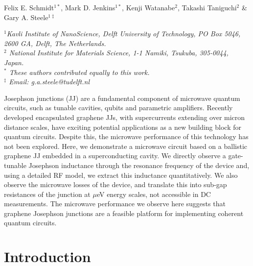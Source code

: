 \documentclass[preprint,
  onecolumn,
  notitlepage,
  amsmath,amssymb,
  aip,
  apl,
]{revtex4-1}
\begin{document}

\vspace{0.5em}

\noindent Felix E. Schmidt$^{1*}$, Mark D. Jenkins$^{1*}$, Kenji Watanabe$^2$, Takashi Taniguchi$^2$ \& Gary A. Steele$^{1\ddagger}$

\vspace{1em}

{\noindent\em $^1$Kavli Institute of NanoScience, Delft University of
	Technology, PO Box 5046, 2600 GA, Delft, The Netherlands.}
{\\\em $^2$ National Institute for Materials Science, 1-1 Namiki, Tsukuba, 305-0044, Japan.}
{\\\em $^*$ These authors contributed equally to this work.}
{\\\em $^\ddagger$ Email: g.a.steele@tudelft.nl}

\vspace{1em}

{\bfseries

\noindent Josephson junctions (JJ) are a fundamental component of microwave quantum circuits, such as tunable cavities, qubits and parametric amplifiers.
%
Recently developed encapsulated graphene JJs, with supercurrents extending over micron distance scales, have exciting potential applications as a new building block for quantum circuits. 
%  
Despite this, the microwave performance of this technology has not been explored.
%  
Here, we demonstrate a microwave circuit based on a ballistic graphene JJ embedded in a superconducting cavity.
%  
We directly observe a gate-tunable Josephson inductance through the resonance frequency of the device and, using a detailed RF model, we extract this inductance quantitatively. 
%
We also observe the microwave losses of the device, and translate this into sub-gap resistances of the junction at $\mu$eV energy scales, not accessible in DC measurements.
%
The microwave performance we observe here suggests that graphene Josephson junctions are a feasible platform for implementing coherent quantum circuits.
}

\setlength{\parindent}{2em}

\newpage

\section{Introduction}
\end{document}
